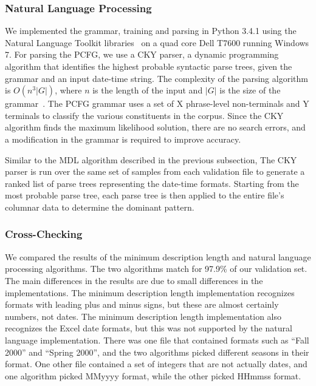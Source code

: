 \subsubsection{Natural Language Processing}
We implemented the grammar, training and parsing in Python 3.4.1 using the Natural Language Toolkit libraries~\cite{nltk} on a quad core Dell T7600 running Windows 7. For parsing the PCFG, we use a CKY parser, a dynamic programming algorithm that identifies the highest probable syntactic parse trees, given the grammar and an input date-time string. The complexity of the parsing algorithm is $O(n^{3}|G|)$, where $n$ is the length of the input and $|G|$ is the size of the grammar~\cite{Younger67}. The PCFG grammar uses a set of X phrase-level non-terminals and Y terminals to classify the various constituents in the corpus. Since the CKY algorithm finds the maximum likelihood solution, there are no search errors, and a modification in the grammar is required to improve accuracy.

Similar to the MDL algorithm described in the previous subsection, The CKY parser is run over the same set of samples from each validation file to generate a ranked list of parse trees representing the date-time formats. Starting from the most probable parse tree, each parse tree is then applied to the entire file's columnar data to determine the dominant pattern.





\subsubsection{Cross-Checking}
We compared the results of the minimum description length and natural language processing algorithms. The two algorithms match for 97.9\% of our validation set. The main differences in the results are due to small differences in the implementations. The minimum description length implementation recognizes formats with leading plus and minus signs, but these are almost certainly numbers, not dates. The minimum description length implementation also recognizes the Excel date formats, but this was not supported by the natural language implementation. There was one file that contained formats such as ``Fall 2000'' and ``Spring 2000'', and the two algorithms picked different seasons in their format. One other file contained a set of integers that are not actually dates, and one algorithm picked MMyyyy format, while the other picked HHmmss format.
